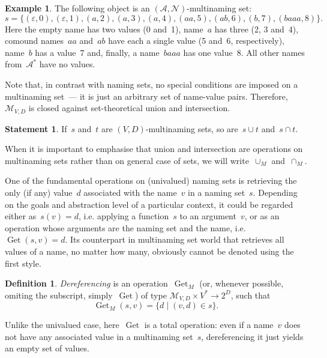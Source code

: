 \documentclass{article}
\theoremstyle{definition}
\newtheorem{Df}{Definition}
\newtheorem{St}{Statement}
\newtheorem{Ex}{Example}
\newcommand{\setcharmvcn}{M}
\newcommand{\setsymbol}[3]{\mathcal{#1}_{#2,#3}}
\newcommand{\setmvcn}[2]{\setsymbol{\setcharmvcn}{#1}{#2}}
\newcommand{\seta}{\mathcal{A}}
\newcommand{\setn}{\mathcal{N}}
\newcommand{\deref}{\operatorname{Get}}
\begin{document}
\begin{Ex}\label{ex:mvcn}
The following object is an $(\seta, \setn)$-multinaming set:
\[
  s = \{
    (\varepsilon, 0),
    (\varepsilon, 1),
    (a,           2),
    (a,           3),
    (a,           4),
    (aa,          5),
    (ab,          6),
    (b,           7),
    (baaa,        8)
  \} .
\]
Here the empty name has two values (0 and~1), name~$a$ has three (2, 3 and~4),
comound names~$aa$ and~$ab$ have each a single value (5 and~6, respectively),
name~$b$ has a value~7 and, finally, a name~$baaa$ has one value~8. All other
names from~$\seta^\ast$ have no values.
\end{Ex}

Note that, in contrast with naming sets, no special conditions are imposed
on a multinaming set~--- it is just an arbitrary set of name-value pairs.
Therefore, $\setmvcn{V}{D}$ is closed against set-theore\-tical union
and intersection.
\begin{St}\label{st:mvcn-setop}
If~$s$ and~$t$ are $(V,D)$-multinaming sets, so are~$s\cup t$ and~$s\cap t$.
\end{St}

When it is important to emphasise that union and intersection are operations
on multinaming sets rather than on general case of sets, we will
write~$\cup_\setcharmvcn$ and~$\cap_\setcharmvcn$.

One of the fundamental operations on (univalued) naming sets is retrieving the
only (if any) value~$d$ associated with the name~$v$ in a naming set~$s$.
Depending on the goals and abstraction level of a particular context, it could
be regarded either as~$s(v)=d$, i.e. applying a function~$s$ to an
argument~$v$, or as an operation whose arguments are the naming set and the
name, i.e.~$\deref(s, v)=d$. Its counterpart in multinaming set world that
retrieves all values of a name, no matter how many, obviously cannot be denoted
using the first style.

\begin{Df}\label{df:mvcn-dereferencing}
\emph{Dereferencing} is an operation~$\deref_\setcharmvcn$ (or, whenever
possible, omiting the subscript, simply~$\deref$) of type
$\setmvcn{V}{D} \times V^\ast \to 2^D$,
such that
\[
  \deref_\setcharmvcn(s, v) = \{ d \mid (v, d) \in s \} .
\]
\end{Df}

Unlike the univalued case, here~$\deref$ is a total operation: even if a
name~$v$ does not have any associated value in a multinaming set~$s$, dereferencing
it just yields an empty set of values.
\end{document}
